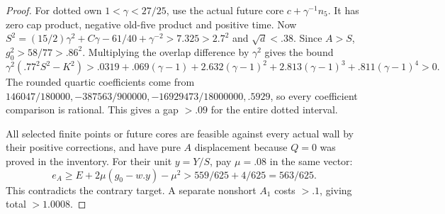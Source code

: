 \documentclass[11pt]{article}
\theoremstyle{definition}
\theoremstyle{remark}
\begin{document}
\begin{proof}
For dotted own $1<\gamma<27/25$, use the actual future core
$c+\gamma^{-1}n_5$. It has zero cap product, negative old-five
product and positive time. Now
$S^2=(15/2)\gamma^2+C\gamma-61/40+\gamma^{-2}>7.325>2.7^2$
and $\sqrt d<.38$. Since $A>S$, $g_0^2>58/77>.86^2$.
Multiplying the overlap difference by $\gamma^2$ gives the bound
\[
 \gamma^2(.77^2S^2-K^2)>
 .0319+.069(\gamma-1)+2.632(\gamma-1)^2
       +2.813(\gamma-1)^3+.811(\gamma-1)^4>0.
\]
The rounded quartic coefficients come from
$146047/180000,\allowbreak -387563/900000,\allowbreak -16929473/18000000,\allowbreak .5929$,
so every coefficient comparison is rational. This gives a gap
$>.09$ for the entire dotted interval.

All selected finite points or future cores are feasible against
every actual wall by their positive corrections, and have pure
$A$ displacement because $Q=0$ was proved in the inventory.
For their unit $y=Y/S$, pay $\mu=.08$ in the same vector:
\[
 e_A\ge E+2\mu(g_0-w.y)-\mu^2
 >559/625+4/625=563/625.
\]
This contradicts the contrary target. A separate nonshort $A_1$
costs $>.1$, giving total $>1.0008$.
\end{proof}
\end{document}
